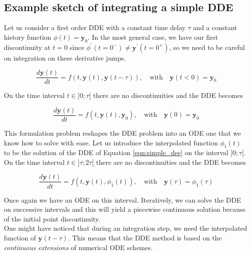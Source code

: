 \documentclass[pmlr]{jmlr}%
\begin{document}
\subsection{Example sketch of integrating a simple DDE}

Let us consider a first order DDE with a constant time delay $\tau$ and a constant history function $\phi(t) = \mathbf{y}_0$. In the most general case, we have our first discontinuity at $t=0$ since $ \phi^{\prime}(t=0^{-}) \neq  \mathbf{y}^{\prime}(t=0^{+})$, so we need to be careful on integration on these derivative jumps.

\begin{equation}
    \frac{d \mathbf{y}(t)}{dt}  = f(t, \mathbf{y}(t), \mathbf{y}(t-\tau)), \quad \text{with} \quad \mathbf{y}(t<0) =  \mathbf{y}_0
\label{eqn:simple_dee}
\end{equation}

On the time interval $t \in ]0;\tau[$ there are no discontinuities and the DDE becomes 

\begin{equation*}
    \frac{d \mathbf{y}(t)}{dt}  = f(t, \mathbf{y}(t), \mathbf{y}_0), \quad \text{with} \quad \mathbf{y}(0) = \mathbf{y}_0
\end{equation*}

This formulation problem reshapes the DDE problem into an ODE one that we know how to solve with ease. Let us introduce the interpolated function $\phi_1(t)$ to be the solution of the DDE of Equation \ref{eqn:simple_dee} on the interval $]0;\tau[$.  \\

On the time interval $t \in ]\tau;2\tau[$ there are no discontinuities and the DDE becomes 

\begin{equation*}
     \frac{d \mathbf{y}(t)}{dt}= f(t,  \mathbf{y}(t), \phi_1(t)), \quad \text{with} \quad \mathbf{y}(\tau) = \phi_1(\tau) 
\end{equation*}

Once again we have an ODE on this interval. Iteratively, we can solve the DDE on successive intervals and this will yield a piecewise continuous solution because of the initial point discontinuity. \\

One might have noticed that during an integration step, we need the interpolated function of $ \mathbf{y}(t-\tau)$. This means that the DDE method is based on the \textit{continuous extensions} of numerical ODE schemes.
\end{document}
